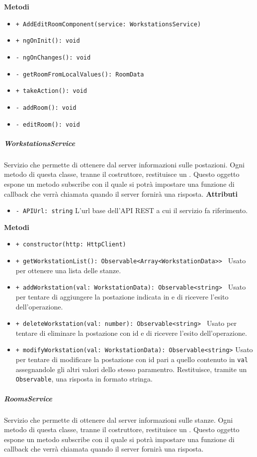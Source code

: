 \textbf{Metodi}
\begin{itemize}
	\item \texttt{+ AddEditRoomComponent(service: WorkstationsService) 	}
	\item \texttt{+ ngOnInit(): void 	}
	\item \texttt{- ngOnChanges(): void 	}
	\item \texttt{- getRoomFromLocalValues(): RoomData 	}
	\item \texttt{+ takeAction(): void 	}
	\item \texttt{- addRoom(): void 	}
	\item \texttt{- editRoom(): void}
\end{itemize}
\subparagraph{WorkstationsService}
Servizio che permette di ottenere dal server informazioni sulle postazioni. Ogni metodo di questa classe, tranne il costruttore, restituisce un . Questo oggetto espone un metodo subscribe con il quale si potrà impostare una funzione di callback che verrà chiamata quando il server fornirà una risposta.
\textbf{Attributi}
\begin{itemize}
	\item \texttt{- APIUrl: string} \newline
	L'url base dell'API REST a cui il servizio fa riferimento.
\end{itemize}
\textbf{Metodi}
\begin{itemize}
	\item \texttt{+ constructor(http: HttpClient) 	}
	\item \texttt{+ getWorkstationList(): Observable<Array<WorkstationData>> 	}
	Usato per ottenere una lista delle stanze.
	\item \texttt{+ addWorkstation(val: WorkstationData): Observable<string> 	}
	Usato per tentare di aggiungere la postazione indicata in  e di ricevere l'esito dell'operazione.
	\item \texttt{+ deleteWorkstation(val: number): Observable<string> 	}
	Usato per tentare di eliminare la postazione con id  e di ricevere l'esito dell'operazione.
	\item \texttt{+ modifyWorkstation(val: WorkstationData): Observable<string>}
	Usato per tentare di modificare la postazione con id pari a quello contenuto in \texttt{val} assegnandole gli altri valori dello stesso paramentro. Restituisce, tramite un \texttt{Observable}, una risposta in formato stringa.
\end{itemize}
\subparagraph{RoomsService}
Servizio che permette di ottenere dal server informazioni sulle stanze. Ogni metodo di questa classe, tranne il costruttore, restituisce un . Questo oggetto espone un metodo subscribe con il quale si potrà impostare una funzione di callback che verrà chiamata quando il server fornirà una risposta.
